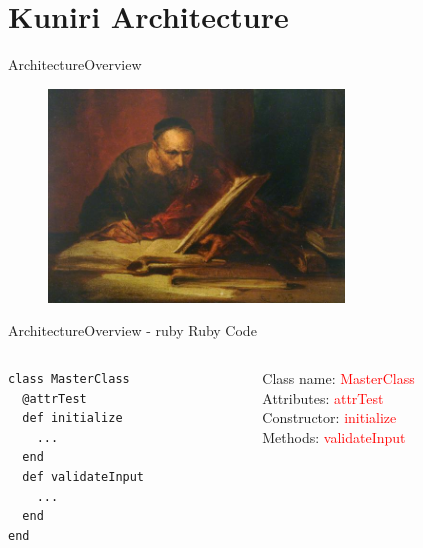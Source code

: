 \documentclass[10pt]{beamer}
\begin{document}
\section{Kuniri Architecture}
\begin{frame}{Architecture}{Overview}
  \begin{figure}[overview]
    \includegraphics[width=0.7\textwidth]{images/scribe_cattermole.jpg}
  \end{figure}
\end{frame}

\begin{frame}[fragile]{Architecture}{Overview - ruby}
  Ruby Code
  \begin{columns}
    \begin{column}{0.6\textwidth}
      \small
\begin{lstlisting}
class MasterClass
  @attrTest
  def initialize
    ...
  end
  def validateInput
    ...
  end
end
\end{lstlisting}
    \end{column}

    \begin{column}{0.4\textwidth}
      Class name: \textcolor{red}{MasterClass}\\ \pause
      Attributes: \textcolor{red}{attrTest}\\ \pause
      Constructor: \textcolor{red}{initialize}\\ \pause
      Methods: \textcolor{red}{validateInput}\\
    \end{column}

  \end{columns}
\end{frame}
\end{document}
